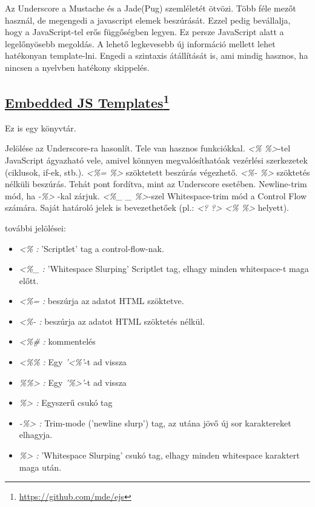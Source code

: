 Az Underscore a Mustache és a Jade(Pug) szemléletét ötvözi.
Több féle mezőt használ, de megengedi a javascript elemek beszúrását.
Ezzel pedig bevállalja, hogy a JavaScript-tel erős függőségben legyen.
Ez persze JavaScript alatt a legelőnyösebb megoldás.
A lehető legkevesebb új információ mellett lehet hatékonyan template-lni.
Engedi a szintaxis átállítását is, ami mindig hasznos, ha nincsen a nyelvben hatékony skippelés.

\subsection[Embedded JS Templates]{\href{https://github.com/mde/ejs}{Embedded JS Templates}\footnote{\url{https://github.com/mde/ejs}}}
\label{sec:embedded}
Ez is egy könyvtár.

Jelölése az Underscore-ra hasonlít.
Tele van hasznos funkciókkal.
\textit{<\% \%>}-tel JavaScript ágyazható vele, amivel könnyen megvalósíthatóak vezérlési szerkezetek (ciklusok, if-ek, stb.).
\textit{<\%= \%>} szöktetett beszúrás végezhető. 
\textit{<\%-  \%>} szöktetés nélküli beszúrás.
Tehát pont fordítva, mint az Underscore esetében.
Newline-trim mód, ha \textit{-\%>} -kal zárjuk.
\textit{<\%\_  \_ \%>}-szel Whitespace-trim mód a Control Flow számára. 
Saját határoló jelek is bevezethetőek (pl.: \textit{<? ?> <\% \%>} helyett).

további jelölései:
\begin{itemize}
\item \emph{\textit{<\%} :} 'Scriptlet' tag a control-flow-nak.
\item \emph{\textit{<\%\_} :} 'Whitespace Slurping' Scriptlet tag, elhagy minden whitespace-t maga előtt.
\item \emph{\textit{<\%=} :} beszúrja az adatot HTML szöktetve.
\item \emph{\textit{<\%-} :} beszúrja az adatot HTML szöktetés nélkül.
\item \emph{\textit{<\%\#} :} kommentelés
\item \emph{\textit{<\%\%} :} Egy \textit{'<\%'}-t ad vissza
\item \emph{\textit{\%\%>} :} Egy \textit{'\%>'}-t ad vissza
\item \emph{\textit{\%>} :} Egyszerű csukó tag
\item \emph{\textit{-\%>} :} Trim-mode ('newline slurp') tag, az utána jövő új sor karaktereket elhagyja.
\item \emph{\textit{\%>} :} 'Whitespace Slurping' csukó tag, elhagy minden whitespace karaktert maga után.
\end{itemize}

